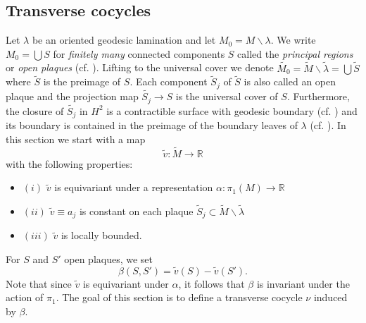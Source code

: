 \documentclass{ip-journal}
\theoremstyle{definition}
\numberwithin{equation}{section}
\newcommand{\R}{\mathbb R}
\begin{document}
\subsection{Transverse cocycles}\label{tranco} Let $\lambda$ be an oriented geodesic lamination and let  $M_0=M \backslash \lambda$. We write $M_0=\bigcup S$ for {\it finitely many} connected components $S$ called the {\it principal regions} or {\it open plaques} (cf. \cite[Lemma 4.3]{casson}). Lifting to the universal cover we denote $\tilde {M_0}= \tilde M \backslash \tilde \lambda=\bigcup \tilde S$ where  $\tilde S$ is the preimage of $S$. Each component $\tilde S_j$ of $\tilde S$  is also called an open plaque and the projection map $\tilde {S_j} \rightarrow S$ is the universal cover of $S$. Furthermore, the closure of $\tilde {S_j}$ in $H^2$ is a contractible surface with geodesic boundary (cf. \cite[Lemma 4.1]{casson}) and its boundary is contained in the preimage of the boundary leaves of $\lambda$ (cf. \cite[definition and remark on p.61]{casson}).   In this section we start with a map  
   \[
   \tilde v: \tilde M \rightarrow \R
   \]
   with the following properties:
   
   \begin{itemize}
   \item $(i)$ $\tilde v$ is equivariant under a representation $\alpha :\pi_1(M) \rightarrow \R$
   \item $(ii)$ $\tilde v \equiv a_j$ is constant on each plaque $\tilde S_j \subset \tilde M \backslash \tilde \lambda$
   \item $(iii)$ $ \tilde v$ is locally bounded.
   \end{itemize}
   
   
   
 
 For $S$ and $S'$ open plaques, we set
\begin{equation}\label{MDefinition3}
\beta (S, S') = \tilde v(S)- \tilde v(S').
\end{equation}
Note that since $\tilde v$ is equivariant under  $\alpha$, it follows that $\beta$ is invariant under the action of $\pi_1$. The goal of this section is to define a transverse cocycle $\nu$ induced by $\beta$. 
\end{document}

